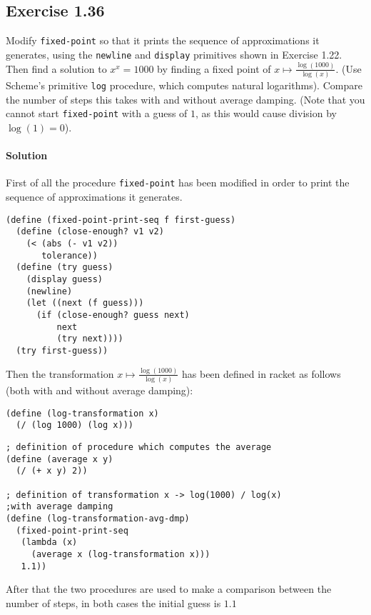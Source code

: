 \subsection*{Exercise 1.36}
Modify \texttt{fixed-point} so that it prints the sequence of approximations it generates, using the \texttt{newline} and 
\texttt{display} primitives shown in Exercise 1.22. Then find a solution to $ x^{x} = 1000 $ by finding a fixed point of
$ x \mapsto \frac{\log(1000)}{\log(x)} $.
(Use Scheme's primitive \texttt{log} procedure, which computes natural logarithms).
Compare the number of steps this takes with and without average damping.
(Note that you cannot start \texttt{fixed-point} with a guess of $ 1 $, as this would cause division by $ \log(1) = 0 $).

\paragraph{Solution} First of all the procedure \texttt{fixed-point} has been modified in order to print the sequence of 
approximations it generates.
\begin{lstlisting}[caption={Procedure \texttt{fixed-point} which prints the sequence of approximations it generates},captionpos=b]
(define (fixed-point-print-seq f first-guess)
  (define (close-enough? v1 v2)
    (< (abs (- v1 v2))
       tolerance))
  (define (try guess)
    (display guess)
    (newline)
    (let ((next (f guess)))
      (if (close-enough? guess next)
          next
          (try next))))
  (try first-guess))
\end{lstlisting}
Then the transformation $ x \mapsto \frac{\log(1000)}{\log(x)} $ has been defined in racket as follows 
(both with and without average damping):
\begin{lstlisting}[caption={Transformation without average-damping},captionpos=b]
(define (log-transformation x)
  (/ (log 1000) (log x)))
\end{lstlisting}
\begin{lstlisting}[caption={Transformation with average damping},captionpos=b]
; definition of procedure which computes the average
(define (average x y) 
  (/ (+ x y) 2))

; definition of transformation x -> log(1000) / log(x) 
;with average damping
(define (log-transformation-avg-dmp)
  (fixed-point-print-seq
   (lambda (x)
     (average x (log-transformation x)))
   1.1))
\end{lstlisting}
After that the two procedures are used to make a comparison between the number of steps, in both cases the initial guess is $ 1.1 $
